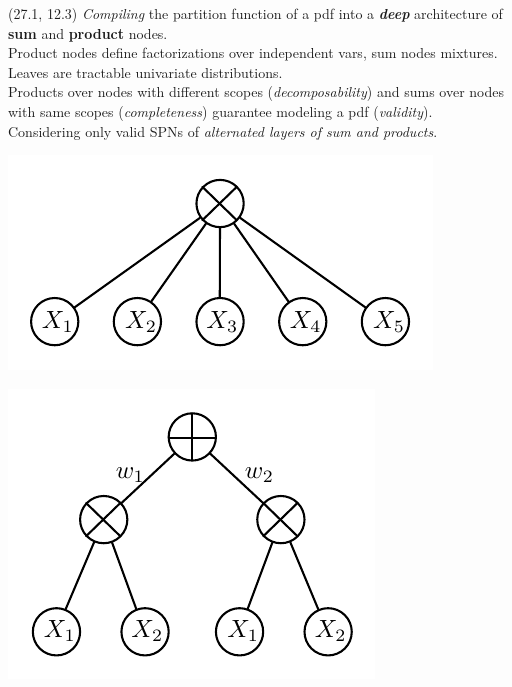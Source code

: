 \documentclass[final]{beamer}
\begin{document}
\begin{frame}{}
\begin{textblock}{25.7}
  \end{textblock}
  
  \begin{textblock}{25.7}(27.1, 12.3)
    \small
    \emph{Compiling} the partition function of a pdf into a \textbf{\emph{deep}} architecture of \textbf{sum}
    and \textbf{product} nodes.\\
    
    Product nodes define factorizations over independent vars, sum
    nodes mixtures. Leaves are tractable univariate distributions.\\
    
    
    Products over nodes with different scopes (\emph{decomposability}) and
    sums over nodes with same scopes (\emph{completeness}) guarantee modeling
    a pdf (\emph{validity}).\\
    
    Considering only valid SPNs of \emph{alternated layers of sum and
      products}.
    
    \begin{minipage}{0.45\linewidth}
      \centering
      \includegraphics[width=0.8\linewidth]{figures/spn-prod}
    \end{minipage}\begin{minipage}{0.45\linewidth}
      \centering
      \includegraphics[width=0.7\linewidth]{figures/spn-sum}
    \end{minipage}
    

\end{textblock}
\end{frame}
\end{document}
